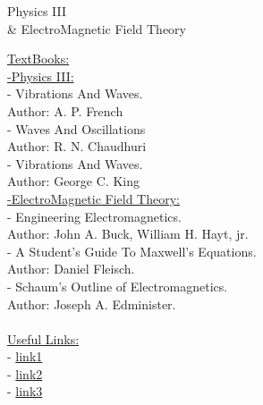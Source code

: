 \documentclass{article}
\begin{document}
\newpage
\begin{center}
    \huge Physics III \\ \& ElectroMagnetic Field Theory
\end{center}    
\underline{\Large TextBooks:}\\ [0.15cm]
\indent \underline{\large -Physics III:} \\[0.15cm]
\indent - Vibrations And Waves. \\ 
\indent \indent Author: A. P. French\\
\indent - Waves And Oscillations \\ 
\indent \indent Author: R. N. Chaudhuri\\
\indent - Vibrations And Waves. \\ 
\indent \indent Author: George C. King\\ 


\indent \underline{\large -ElectroMagnetic Field Theory:} \\[0.15cm]
\indent - Engineering Electromagnetics. \\ 
\indent \indent Author: John A. Buck, William H. Hayt, jr.\\
\indent - A Student's Guide To Maxwell's Equations.\\ 
\indent \indent Author: Daniel Fleisch.\\
\indent - Schaum's Outline of Electromagnetics.\\
\indent \indent Author: Joseph A. Edminister. \\ \\

\noindent \underline{\Large Useful Links:}\\
- \href{URL}{link1}\\
- \href{URL}{link2}\\
- \href{URL}{link3}\\\\


    
\end{document}
